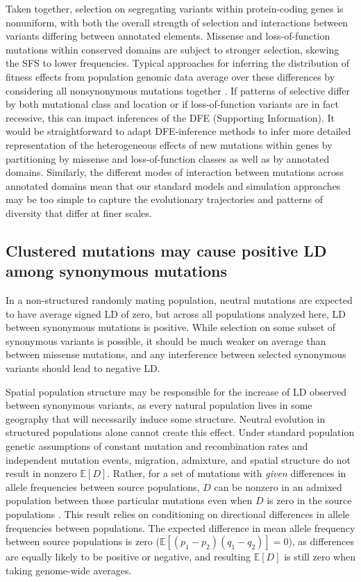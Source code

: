 \documentclass[]{article}
\newcommand{\E}{\mathbb{E}}
\begin{document}
Taken together, selection on segregating variants within protein-coding genes
is nonuniform, with both the overall strength of selection and interactions
between variants differing between annotated elements. Missense and
loss-of-function mutations within conserved domains are subject to stronger
selection, skewing the SFS to lower frequencies. Typical approaches for
inferring the distribution of fitness effects from population genomic data
average over these differences by considering all nonsynonymous mutations
together \citep{Boyko2008-zk,Kim2017-xo}. If patterns of selective differ by
both mutational class and location or if loss-of-function variants are in fact
recessive, this can impact inferences of the DFE (Supporting Information). It
would be straightforward to adapt DFE-inference methods to infer more detailed
representation of the heterogeneous effects of new mutations within genes by
partitioning by missense and loss-of-function classes as well as by annotated
domains. Similarly, the different modes of interaction between mutations across
annotated domains mean that our standard models and simulation approaches may
be too simple to capture the evolutionary trajectories and patterns of
diversity that differ at finer scales.

\subsection{Clustered mutations may cause positive LD among synonymous mutations}

In a non-structured randomly mating population, neutral mutations are expected to have
average signed LD of zero, but across all populations analyzed here, LD between
synonymous mutations is positive. While selection on some subset of synonymous
variants is possible, it should be much weaker on average than between missense
mutations, and any interference between selected synonymous variants should
lead to negative LD.

Spatial population structure may be responsible for the increase of LD observed
between synonymous variants, as every natural population lives in some
geography that will necessarily induce some structure. Neutral evolution in
structured populations alone cannot create this effect. Under standard
population genetic assumptions of constant mutation and recombination rates and
independent mutation events, migration, admixture, and spatial structure do not
result in nonzero \(\E[D]\). Rather, for a set of mutations with \emph{given}
differences in allele frequencies between source populations, \(D\) can be
nonzero in an admixed population between those particular mutations even when
\(D\) is zero in the source populations \citep{Cavalli-Sforza1971-jv}. This
result relies on conditioning on directional differences in allele frequencies
between populations. The expected difference in mean allele frequency between
source populations is zero (\(\E[(p_1-p_2)(q_1-q_2)] = 0\)), as differences are
equally likely to be positive or negative, and resulting \(\E[D]\) is still
zero when taking genome-wide averages.
\end{document}
